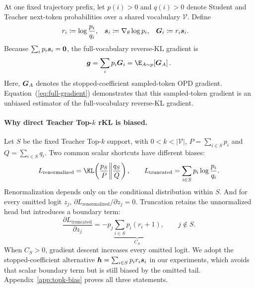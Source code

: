 At one fixed trajectory prefix, let $p(i)>0$ and $q(i)>0$ denote Student and Teacher
next-token probabilities over a shared vocabulary $\mathcal V$. Define
\begin{equation}
 \begin{aligned}
 r_i &\coloneqq \log\frac{p_i}{q_i}, &
 \bm{s}_i &\coloneqq \nabla_\theta\log p_i, &
 \bm{G}_i &\coloneqq r_i\bm{s}_i.
 \end{aligned}
 \label{eq:token-gradient}
\end{equation}
Because $\sum_i p_i\bm{s}_i=\bm 0$, the full-vocabulary reverse-KL gradient is
\begin{equation}
 \bgrad
 =\sum_i p_i\btoken_i
 =\E_{A\sim p}\!\left[\btoken_A\right].
 \label{eq:full-gradient}
\end{equation}
Here, $\bm{G}_A$ denotes the stopped-coefficient sampled-token OPD gradient. Equation~(\ref{eq:full-gradient}) demonstrates that this sampled-token gradient is an unbiased estimator of the full-vocabulary reverse-KL gradient.

\paragraph{Why direct Teacher Top-$k$ rKL is biased.}
Let $S$ be the fixed Teacher Top-$k$ support, with $0<k<|\mathcal V|$, $P=\sum_{i\in S}p_i$ and
$Q=\sum_{i\in S}q_i$. Two common scalar shortcuts have different biases:
\begin{equation}
 L_{\mathrm{renormalized}}
 =\KL\!\left(\frac{p_S}{P}\middle\|\frac{q_S}{Q}\right),
 \qquad
 L_{\mathrm{truncated}}=\sum_{i\in S}p_i\log\frac{p_i}{q_i}.
 \label{eq:topk-shortcuts}
\end{equation}
Renormalization depends only on the conditional distribution within $S$. And for every omitted logit $z_j$, $\partial L_{\mathrm{renormalized}}/\partial z_j=0$. Truncation retains the unnormalized head but introduces a boundary term:
\begin{equation}
 \frac{\partial L_{\mathrm{truncated}}}{\partial z_j}
 =-p_j\underbrace{\sum_{i\in S}p_i(r_i+1)}_{C_S},
 \qquad j\notin S.
 \label{eq:truncated-tail-push}
\end{equation}
When $C_S>0$, gradient descent increases every omitted logit.
We adopt the stopped-coefficient alternative \citep{zhu2026many}
$\bm{h}=\sum_{i\in S}p_i r_i\bm{s}_i$ in our experiments, which avoids that scalar boundary term but is
still biased by the omitted tail. Appendix~\ref{app:topk-bias} proves all three statements.

